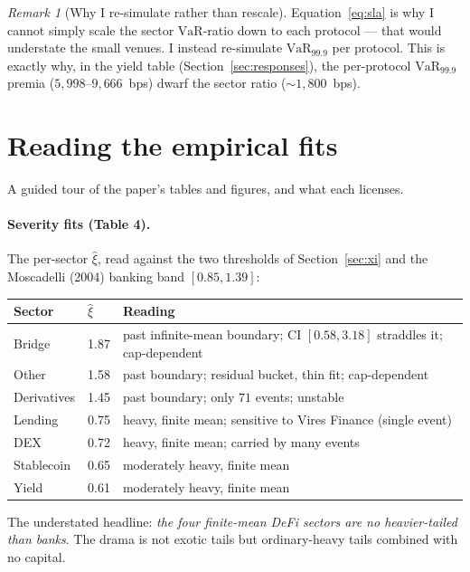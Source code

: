 \documentclass[11pt]{article}
\theoremstyle{definition}
\theoremstyle{remark}
\newtheorem{remark}[theorem]{Remark}
\theoremstyle{definition}
\newcommand{\VaR}{\mathrm{VaR}}
\newcommand{\1}{\mathbf{1}}
\begin{document}
\begin{remark}[Why I re-simulate rather than rescale]
Equation~\eqref{eq:sla} is why I cannot simply scale the sector $\VaR$-ratio
down to each protocol --- that would understate the small venues. I instead
re-simulate $\VaR_{99.9}$ per protocol. This is exactly why, in the yield table
(Section~\ref{sec:responses}), the per-protocol $\VaR_{99.9}$ premia
($5{,}998$--$9{,}666$~bps) dwarf the sector ratio ($\sim 1{,}800$~bps).
\end{remark}

\section{Reading the empirical fits}\label{sec:empirical}

A guided tour of the paper's tables and figures, and what each licenses.

\paragraph{Severity fits (Table 4).}
The per-sector $\hat\xi$, read against the two thresholds of Section~\ref{sec:xi} and
the Moscadelli (2004) banking band $[0.85,1.39]$:

\begin{center}
\begin{tabular}{llL{6.9cm}}
\toprule
Sector & $\hat\xi$ & Reading \\
\midrule
Bridge & 1.87 & past infinite-mean boundary; CI $[0.58,3.18]$ straddles it; cap-dependent \\
Other & 1.58 & past boundary; residual bucket, thin fit; cap-dependent \\
Derivatives & 1.45 & past boundary; only $71$ events; unstable \\
Lending & 0.75 & heavy, finite mean; sensitive to Vires Finance (single event) \\
DEX & 0.72 & heavy, finite mean; carried by many events \\
Stablecoin & 0.65 & moderately heavy, finite mean \\
Yield & 0.61 & moderately heavy, finite mean \\
\bottomrule
\end{tabular}
\end{center}

\noindent The understated headline: \emph{the four finite-mean DeFi sectors are
no heavier-tailed than banks}. The drama is not exotic tails but ordinary-heavy
tails combined with no capital.
\end{document}
